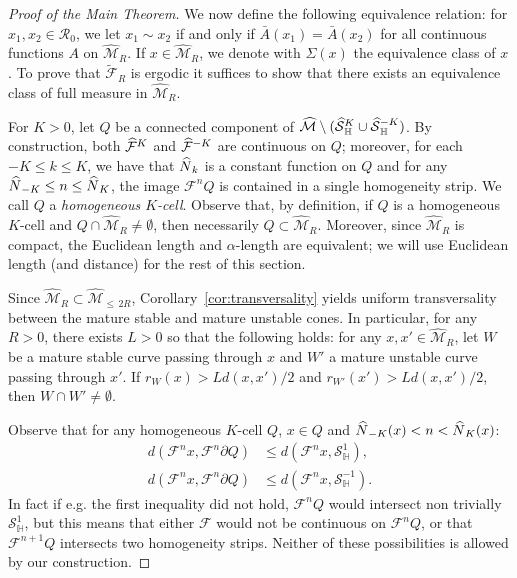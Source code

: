 \documentclass[AHL, Unicode, longabstracts,published]{cedram}
\newcommand{\homo}{\mathbb{H}}
\newcommand{\cR}{\mathcal{R}}
\newcommand{\cm}{\mathcal{F}}
\newcommand{\csp}{\mathcal{M}}
\newcommand{\cmp}{\hat\cm}
\newcommand{\cspi}{\widehat{\csp}}
\newcommand{\cspiu}[1]{\widehat{\csp}_{\le\,#1}}
\newcommand{\brA}{\bar{A}}
\newcommand{\tcF}{\widetilde{\mathcal{F}}}
\newcommand{\singPrivate}{\mathcal{S}}
\newcommand{\hsing}[1]{{\singPrivate}_\homo^{#1}}
\newcommand{\hsingp}[1]{\hat{\singPrivate}_\homo^{#1}}
\newcommand{\admName}{\alpha^{+}}
\newcommand{\Np}{\hat N}
\renewcommand{\admName}{\alpha}
\let\oldhat\hat
\renewcommand*{\hat}[1]{\mathchoice{\widehat{#1}}{\widehat{#1}}{\oldhat{#1}}{\oldhat{#1}}}
\begin{document}
\begin{proof}[Proof of the Main Theorem]
We now define the following equivalence relation: for $x_{1},x_{2}\in\cR_{0}$, we let $x_1\sim x_2$ if and only if $\brA(x_1)=\brA(x_2)$ for all continuous functions $A$ on $\cspi_R$. If $x\in\cspi_{R}$, we denote with $\Sigma(x)$ the equivalence class of $x$. To prove that $\tcF_R$ is ergodic it suffices to show that there exists an equivalence class of full measure in $\cspi_R$.

For $K > 0$, let $Q$ be a connected component of $\cspi\setminus(\hsingp{K}\cup\hsingp{-K})$. By construction, both $\cmp^K$ and $\cmp^{-K}$ are continuous on $Q$; moreover, for each $-K\le k\le K$, we have that $\Np_{k}$ is a constant function on $Q$ and for any $\Np_{-K}\le n\le\Np_{K}$, the image $\cm^{n}Q$ is contained in a single homogeneity strip. We call $Q$ a \emph{homogeneous $K$-cell}. Observe that, by definition, if $Q$ is a homogeneous $K$-cell and $Q\cap\cspi_{R}\ne\emptyset$, then necessarily $Q\subset\cspi_{R}$. Moreover, since $\cspi_{R}$ is compact, the Euclidean length and $\admName$-length are equivalent; we will use Euclidean length (and distance) for the rest of this section.

Since $\cspi_{R}\subset\cspiu{2R}$, Corollary~\ref{cor:transversality} yields uniform transversality between the mature stable and mature unstable cones. In particular, for any $R > 0$, there exists $L> 0$ so that the following holds: for any $x, x'\in\cspi_{R}$, let $W$ be a mature stable curve passing through $x$ and $W'$ a mature unstable curve passing through $x'$. If $r_{W}(x) > Ld(x,x')/2$ and $r_{W'}(x') > Ld(x,x')/2$, then $W\cap W'\ne\emptyset$.

Observe that for any homogeneous $K$-cell $Q$, $x\in Q$ and $\Np_{-K}(x) < n < \Np_{K}(x)$:
\begin{align*}
d\left(\cm^{n}x,\cm^{n}\partial Q\right) &\le d\left(\cm^{n}x,\hsing1\right),\\
d\left(\cm^{n}x,\cm^{n}\partial Q\right) &\le d\left(\cm^{n}x,\hsing{-1}\right).
\end{align*}
In fact if e.g. the first inequality did not hold, $\cm^{n}Q$ would intersect non trivially $\hsing1$, but this means that either $\cm$ would not be continuous on $\cm^{n}Q$, or that $\cm^{n+1}Q$ intersects two homogeneity strips. Neither of these possibilities is allowed by our construction.


\end{proof}
\end{document}
